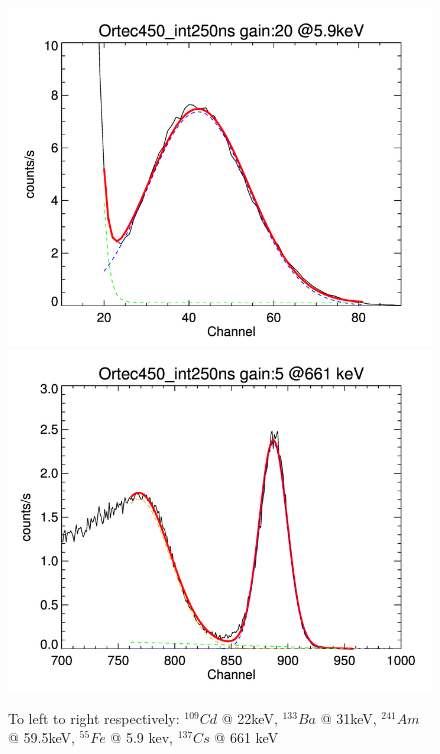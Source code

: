 \documentclass[10pt,a4paper, openany]{book}
\begin{document}
\begin{figure}[!h]
\begin{center}
\includegraphics[scale=0.19]{imm/fe.png}
\includegraphics[scale=0.19]{imm/cs.png}
\end{center}
\caption{To left to right respectively: $^{109}Cd$ @ 22keV, $^{133}Ba$ @ 31keV, $^{241}Am$ @ 59.5keV, $^{55}Fe$ @ 5.9 kev, $^{137}Cs$ @ 661 keV} 
\label{fig:fit}
\end{figure}
\end{document}
